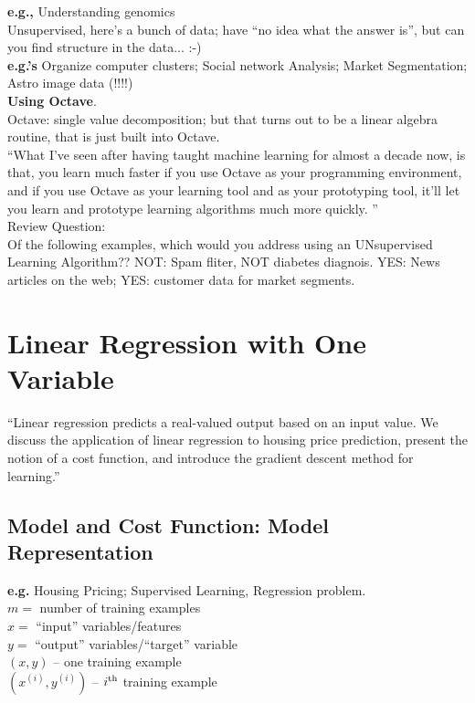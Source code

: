 \documentclass[11pt,a4paper]{article}
\begin{document}
{\bf e.g.,} Understanding genomics\\
Unsupervised, here's a bunch of data; have ``no idea what the answer is'', but 
can you find structure in the data... :-) \\

{\bf e.g.'s} Organize computer clusters; Social network Analysis; Market Segmentation; Astro image data (!!!!) \\

{\bf Using Octave}. \\

Octave: single value decomposition; but that turns out to be a linear algebra routine, that is just built into Octave. \\

``What I've seen after having taught machine learning for almost a decade now, is that, you learn much faster if you use Octave as your programming environment, and if you use Octave as your learning tool and as your prototyping tool, it'll let you learn and prototype learning algorithms much more quickly. ''\\

Review Question:\\
Of the following examples, which would you address using an UNsupervised Learning Algorithm??
NOT: Spam fliter, NOT diabetes diagnois. 
YES: News articles on the web; YES: customer data for market segments. 

\newpage




\section{Linear Regression with One Variable}
``Linear regression predicts a real-valued output based on an input value. We discuss the application of linear regression to housing price prediction, present the notion of a cost function, and introduce the gradient descent method for learning.''

\subsection{Model and Cost Function: Model Representation}
{\bf e.g.} Housing Pricing; Supervised Learning, Regression problem. \\

$m=$ number of training examples\\
$x=$ ``input'' variables/features\\
$y=$ ``output'' variables/``target'' variable\\
$(x,y)$ -- one training example\\
$(x^{(i)},y^{(i)})$ -- $i^{\rm th}$ training example\\
\end{document}
